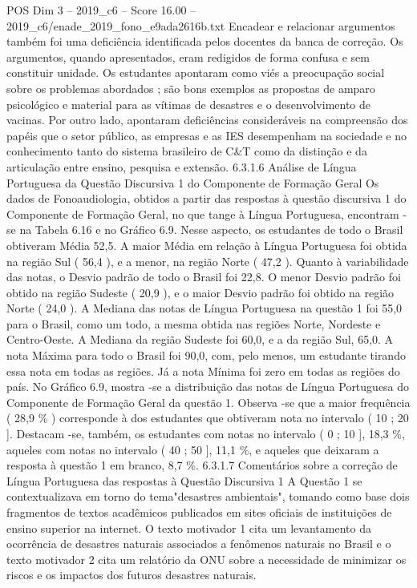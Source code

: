 \begin{textsample}{POS Dim 3 – 2019\_c6 – Score 16.00 – 2019\_c6/enade\_2019\_fono\_e9ada2616b.txt}
Encadear e relacionar argumentos também foi uma deficiência identificada pelos docentes da banca de correção.
Os argumentos, quando apresentados, eram redigidos de forma confusa e sem constituir unidade.
Os estudantes apontaram como viés a preocupação social sobre os problemas abordados ; são bons exemplos as propostas de amparo psicológico e material para as vítimas de desastres e o desenvolvimento de vacinas.
Por outro lado, apontaram deficiências consideráveis na compreensão dos papéis que o setor público, as empresas e as IES desempenham na sociedade e no conhecimento tanto do sistema brasileiro de C\&T como da distinção e da articulação entre ensino, pesquisa e extensão. 6.3.1.6 Análise de Língua Portuguesa da Questão Discursiva 1 do Componente de Formação Geral Os dados de Fonoaudiologia, obtidos a partir das respostas à questão discursiva 1 do Componente de Formação Geral, no que tange à Língua Portuguesa, encontram -se na Tabela 6.16 e no Gráfico 6.9.
Nesse aspecto, os estudantes de todo o Brasil obtiveram Média 52,5.
A maior Média em relação à Língua Portuguesa foi obtida na região Sul ( 56,4 ), e a menor, na região Norte ( 47,2 ).
Quanto à variabilidade das notas, o Desvio padrão de todo o Brasil foi 22,8.
O menor Desvio padrão foi obtido na região Sudeste ( 20,9 ), e o maior Desvio padrão foi obtido na região Norte ( 24,0 ).
A Mediana das notas de Língua Portuguesa na questão 1 foi 55,0 para o Brasil, como um todo, a mesma obtida nas regiões Norte, Nordeste e Centro-Oeste.
A Mediana da região Sudeste foi 60,0, e a da região Sul, 65,0.
A nota Máxima para todo o Brasil foi 90,0, com, pelo menos, um estudante tirando essa nota em todas as regiões.
Já a nota Mínima foi zero em todas as regiões do país.
No Gráfico 6.9, mostra -se a distribuição das notas de Língua Portuguesa do Componente de Formação Geral da questão 1.
Observa -se que a maior frequência ( 28,9 \% ) corresponde à dos estudantes que obtiveram nota no intervalo ( 10 ; 20 ].
Destacam -se, também, os estudantes com notas no intervalo ( 0 ; 10 ], 18,3 \%, aqueles com notas no intervalo ( 40 ; 50 ], 11,1 \%, e aqueles que deixaram a resposta à questão 1 em branco, 8,7 \%. 6.3.1.7 Comentários sobre a correção de Língua Portuguesa das respostas à Questão Discursiva 1 A Questão 1 se contextualizava em torno do tema"desastres ambientais", tomando como base dois fragmentos de textos acadêmicos publicados em sites oficiais de instituições de ensino superior na internet.
O texto motivador 1 cita um levantamento da ocorrência de desastres naturais associados a fenômenos naturais no Brasil e o texto motivador 2 cita um relatório da ONU sobre a necessidade de minimizar os riscos e os impactos dos futuros desastres naturais.

\end{textsample}
